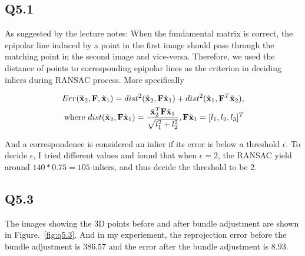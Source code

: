 \documentclass[11pt]{article}
\begin{document}
\subsection*{Q5.1}

As suggested by the lecture notes: When the fundamental matrix is correct, the epipolar line induced by a point in the first image should pass through the matching point in the second image and vice-versa.
Therefore, we used the distance of points to corresponding epipolar lines as the criterion in deciding inliers during RANSAC process. More specifically

\begin{align}
  Err(\tilde{\mathbf{x}}_2, \mathbf{F}, \tilde{\mathbf{x}}_1) = dist^2(\tilde{\mathbf{x}}_2, \mathbf{F} \tilde{\mathbf{x}}_1) + dist^2(\tilde{\mathbf{x}}_1, \mathbf{F}^T \tilde{\mathbf{x}}_2),  \\
  \textrm{where } dist(\tilde{\mathbf{x}}_2, \mathbf{F} \tilde{\mathbf{x}}_1) = \frac{\tilde{\mathbf{x}}_2^T \mathbf{F} \tilde{\mathbf{x}}_1}{\sqrt{l_1^2 + l_2^2}}, \mathbf{F} \tilde{\mathbf{x}}_1=[l_1, l_2, l_3]^T
\end{align}

And a correspondence is considered an inlier if its error is below a threshold $\epsilon$. To decide $\epsilon$, I tried different values and found that when $\epsilon=2$, the RANSAC yield around $140*0.75=105$ inliers, and thus decide the threshold to be 2.

\newpage

\subsection*{Q5.3}

The images showing the 3D points before and after bundle adjustment are shown in Figure.~\ref{fig:q5.3}. And in my experiement, the reprojection error before the bundle adjustment is $386.57$ and the error after the bundle adjustment is $8.93$.
\end{document}
